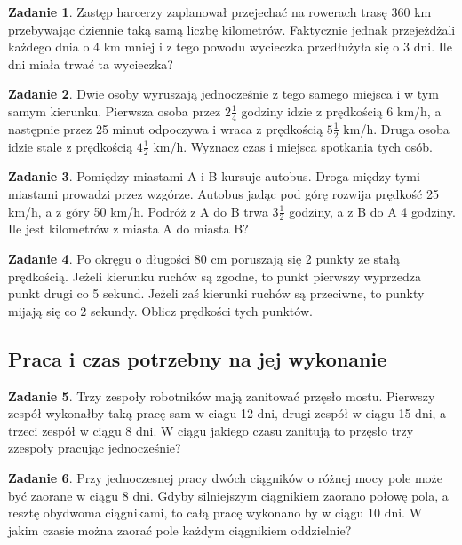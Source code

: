 \documentclass[11pt]{article}
\theoremstyle{definition}
\newtheorem{zad}{Zadanie}
\begin{document}
\begin{zad}
Zastęp harcerzy zaplanował przejechać na rowerach trasę 360 km przebywając dziennie taką samą liczbę kilometrów. Faktycznie jednak przejeżdżali każdego dnia o 4 km mniej i z tego powodu wycieczka przedłużyła się o 3 dni. Ile dni miała trwać ta wycieczka?
\end{zad}

\begin{zad}
Dwie osoby wyruszają jednocześnie z tego samego miejsca i w tym samym kierunku. Pierwsza osoba przez $2\frac14$ godziny idzie z prędkością 6 km/h, a następnie przez 25 minut odpoczywa i wraca z prędkością $5\frac12$ km/h. Druga osoba idzie stale z prędkością $4\frac12$ km/h. Wyznacz czas i miejsca spotkania tych osób.
\end{zad}


\begin{zad}
Pomiędzy miastami A i B kursuje autobus. Droga między tymi miastami prowadzi przez wzgórze. Autobus jadąc pod górę rozwija prędkość 25 km/h, a z góry 50 km/h. Podróż z A do B trwa $3\frac12$ godziny, a z B do A 4 godziny. Ile jest kilometrów z miasta A do miasta B?
\end{zad}

\begin{zad}
Po okręgu o długości 80 cm poruszają się 2 punkty ze stałą prędkością. Jeżeli kierunku ruchów są zgodne, to punkt pierwszy wyprzedza punkt drugi co 5 sekund. Jeżeli zaś kierunki ruchów są przeciwne, to punkty mijają się co 2 sekundy. Oblicz prędkości tych punktów.
\end{zad}

\subsection{Praca i czas potrzebny na jej wykonanie}

\begin{zad}
Trzy zespoły robotników mają zanitować przęsło mostu. Pierwszy zespół wykonałby taką pracę sam w ciagu 12 dni, drugi zespół w ciągu 15 dni, a trzeci zespół w ciągu 8 dni. W ciągu jakiego czasu zanitują to przęsło trzy zzespoły pracując jednocześnie?
\end{zad}

\begin{zad}
Przy jednoczesnej pracy dwóch ciągników o różnej mocy pole może być zaorane w ciągu 8 dni. Gdyby silniejszym ciągnikiem zaorano połowę pola, a resztę obydwoma ciągnikami, to całą pracę wykonano by w ciągu 10 dni. W jakim czasie można zaorać pole każdym ciągnikiem oddzielnie?
\end{zad}
\end{document}

